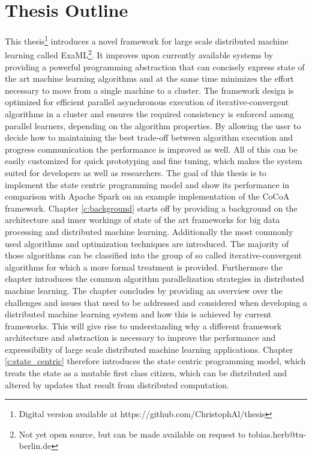 \section{Thesis Outline}
This thesis\footnote{Digital version available at https://github.com/ChristophAl/thesis} introduces a novel framework for large scale distributed machine learning called ExaML\footnote{Not yet open source, but can be made available on request to tobias.herb@tu-berlin.de}.
It improves upon currently available systems by providing a powerful programming abstraction that can concisely express state of the art machine learning algorithms and at the same time minimizes the effort necessary to move from a single machine to a cluster.
The framework design is optimized for efficient parallel asynchronous execution of iterative-convergent algorithms in a cluster and ensures the required consistency is enforced among parallel learners, depending on the algorithm properties. By allowing the user to decide how to maintaining the best trade-off between algorithm execution and progress communication the performance is improved as well.
All of this can be easily customized for quick prototyping and fine tuning, which makes the system suited for developers as well as researchers.
The goal of this thesis is to implement the state centric programming model and show its performance in comparison with Apache Spark on an example implementation of the CoCoA \cite{Jaggi2014} framework.
Chapter \ref{c:background} starts off by providing a background on the architecture and inner workings of state of the art frameworks for big data processing and distributed machine learning.
Additionally the most commonly used algorithms and optimization techniques are introduced.
The majority of those algorithms can be classified into the group of so called iterative-convergent algorithms for which a more formal treatment is provided.
Furthermore the chapter introduces the common algorithm parallelization strategies in distributed machine learning.
The chapter concludes by providing an overview over the challenges and issues that need to be addressed and considered when developing a distributed machine learning system and how this is achieved by current frameworks.
This will give rise to understanding why a different framework architecture and abstraction is necessary to improve the performance and expressibility of large scale distributed machine learning applications.
Chapter \ref{c:state_centric} therefore introduces the state centric programming model, which treats the state as a mutable first class citizen, which can be distributed and altered by updates that result from distributed computation.
